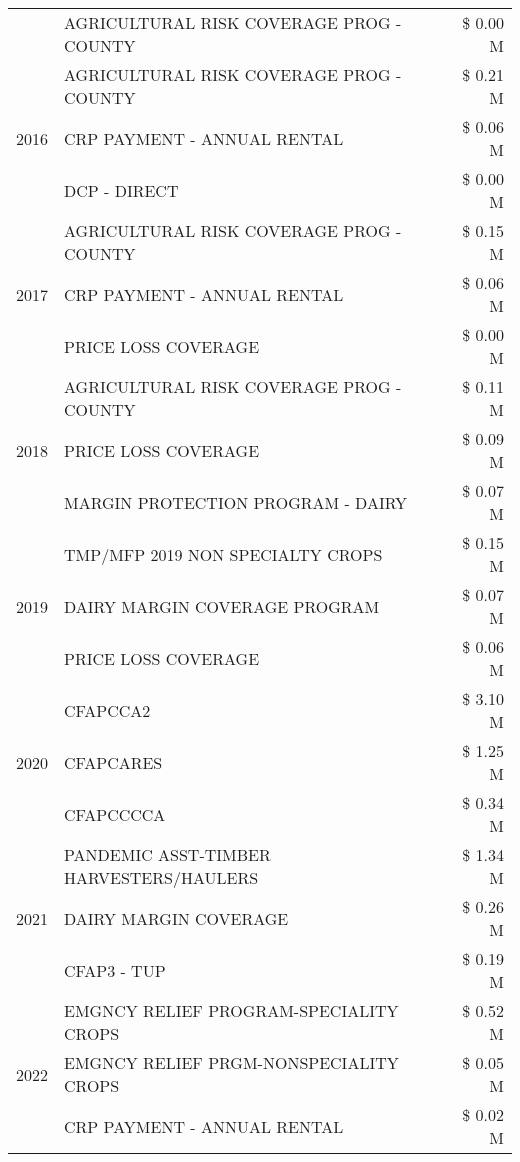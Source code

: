 \begin{tabular}{llr}
 & AGRICULTURAL RISK COVERAGE PROG - COUNTY & \$ 0.00 M \\
\cline{1-3}
\multirow[t]{3}{*}{2016} & AGRICULTURAL RISK COVERAGE PROG - COUNTY & \$ 0.21 M \\
 & CRP PAYMENT - ANNUAL RENTAL & \$ 0.06 M \\
 & DCP - DIRECT & \$ 0.00 M \\
\cline{1-3}
\multirow[t]{3}{*}{2017} & AGRICULTURAL RISK COVERAGE PROG - COUNTY & \$ 0.15 M \\
 & CRP PAYMENT - ANNUAL RENTAL & \$ 0.06 M \\
 & PRICE LOSS COVERAGE & \$ 0.00 M \\
\cline{1-3}
\multirow[t]{3}{*}{2018} & AGRICULTURAL RISK COVERAGE PROG - COUNTY & \$ 0.11 M \\
 & PRICE LOSS COVERAGE & \$ 0.09 M \\
 & MARGIN PROTECTION PROGRAM - DAIRY & \$ 0.07 M \\
\cline{1-3}
\multirow[t]{3}{*}{2019} & TMP/MFP 2019 NON SPECIALTY CROPS & \$ 0.15 M \\
 & DAIRY MARGIN COVERAGE PROGRAM & \$ 0.07 M \\
 & PRICE LOSS COVERAGE & \$ 0.06 M \\
\cline{1-3}
\multirow[t]{3}{*}{2020} & CFAPCCA2 & \$ 3.10 M \\
 & CFAPCARES & \$ 1.25 M \\
 & CFAPCCCCA & \$ 0.34 M \\
\cline{1-3}
\multirow[t]{3}{*}{2021} & PANDEMIC ASST-TIMBER HARVESTERS/HAULERS & \$ 1.34 M \\
 & DAIRY MARGIN COVERAGE & \$ 0.26 M \\
 & CFAP3 - TUP & \$ 0.19 M \\
\cline{1-3}
\multirow[t]{3}{*}{2022} & EMGNCY RELIEF PROGRAM-SPECIALITY CROPS & \$ 0.52 M \\
 & EMGNCY RELIEF PRGM-NONSPECIALITY CROPS & \$ 0.05 M \\
 & CRP PAYMENT - ANNUAL RENTAL & \$ 0.02 M \\
\cline{1-3}
\bottomrule
\end{tabular}

